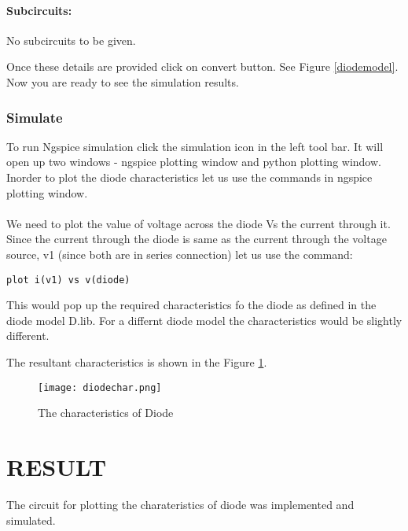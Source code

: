 \paragraph{Subcircuits:} No subcircuits to be given.

\noindent Once these details are provided click on convert button. See Figure \ref{diodemodel}. Now you are ready to see the simulation results.

\subsubsection{Simulate} To run Ngspice simulation click the simulation icon in the left tool bar. It will open up two windows - ngspice plotting window and python plotting window. Inorder to plot the diode characteristics let us use the commands in ngspice plotting window. 

\paragraph{}We need to plot the value of voltage across the diode Vs the current through it. Since the current through the diode is same as the current through the voltage source, v1 (since both are in series connection) let us use the command:

\texttt{plot i(v1) vs v(diode)}

This would pop up the required characteristics fo the diode as defined in the diode model D.lib. For a differnt diode model the characteristics would be slightly different.

The resultant characteristics is shown in the Figure \ref{diodechara}.

\begin{figure}[H]
\centering
\texttt{[image: diodechar.png]}
\caption{The characteristics of Diode}
\label{diodechara}
\end{figure}

\section*{RESULT}
The circuit for plotting the charateristics of diode was implemented and simulated.


